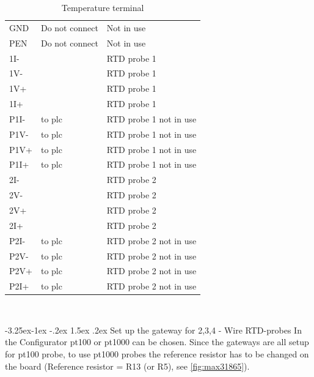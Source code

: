 \documentclass[10pt,letterpaper]{article}
\makeatletter
\renewcommand\paragraph{\@startsection{paragraph}{4}{\z@}%
  {-3.25ex\@plus -1ex \@minus -.2ex}%
  {1.5ex \@plus .2ex}%
  {\normalfont\normalsize\bfseries}}
\makeatother
\begin{document}
	
			\begin{table}[htpb!]
				\centering
				\caption{Temperature terminal}
				\label{tab:d-term}
				\begin{tabular}{lll}
				GND  	& Do not connect 		& Not in use \\
				PEN 	& Do not connect 		& Not in use \\
				1I-		& 		& RTD probe 1\\
				1V-		& 		& RTD probe 1\\
				1V+ 	&  		& RTD probe 1\\
				1I+		& 		& RTD probe 1\\
				P1I-	& to plc& RTD probe 1 not in use\\
				P1V-	& to plc& RTD probe 1 not in use\\
				P1V+ 	& to plc& RTD probe 1 not in use\\
				P1I+	& to plc& RTD probe 1 not in use\\
				2I-		& 		& RTD probe 2\\
				2V-		& 		& RTD probe 2\\
				2V+ 	&  		& RTD probe 2\\
				2I+		& 		& RTD probe 2\\
				P2I-	& to plc& RTD probe 2 not in use\\
				P2V-	& to plc& RTD probe 2 not in use\\
				P2V+ 	& to plc& RTD probe 2 not in use\\
				P2I+	& to plc& RTD probe 2 not in use\\

		
				\end{tabular}\\ 
			\end{table}

			\paragraph{Set up the gateway for 2,3,4 - Wire RTD-probes}
			In the Configurator pt100 or pt1000 can be chosen. Since the gateways are all setup for pt100 probe, to use pt1000 probes the reference resistor has to be changed on the board (Reference resistor = R13 (or R5), see \autoref{fig:max31865}). \\
		
\end{document}
